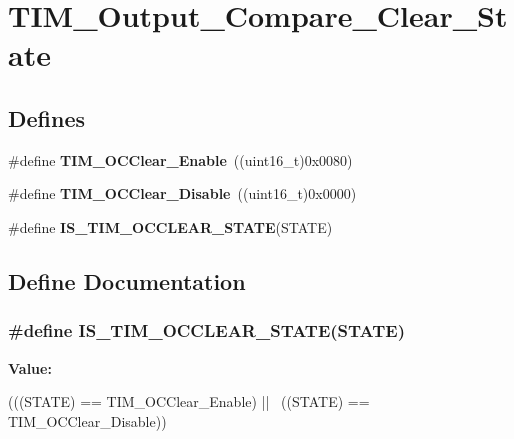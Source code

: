 \hypertarget{group__TIM__Output__Compare__Clear__State}{
\section{TIM\_\-Output\_\-Compare\_\-Clear\_\-State}
\label{group__TIM__Output__Compare__Clear__State}
}
\subsection*{Defines}
\begin{DoxyCompactItemize}
\item 
\hypertarget{group__TIM__Output__Compare__Clear__State_ga1b7bce48b3e1478aad98c95fbbe7a6e0}{
\#define {\bfseries TIM\_\-OCClear\_\-Enable}~((uint16\_\-t)0x0080)}
\label{group__TIM__Output__Compare__Clear__State_ga1b7bce48b3e1478aad98c95fbbe7a6e0}

\item 
\hypertarget{group__TIM__Output__Compare__Clear__State_gadb09946cb5dded7520baf4b19173204d}{
\#define {\bfseries TIM\_\-OCClear\_\-Disable}~((uint16\_\-t)0x0000)}
\label{group__TIM__Output__Compare__Clear__State_gadb09946cb5dded7520baf4b19173204d}

\item 
\#define {\bfseries IS\_\-TIM\_\-OCCLEAR\_\-STATE}(STATE)
\end{DoxyCompactItemize}


\subsection{Define Documentation}
\hypertarget{group__TIM__Output__Compare__Clear__State_ga5297586b42da9263ac4f767c83202fed}{
\subsubsection[{IS\_\-TIM\_\-OCCLEAR\_\-STATE}]{\setlength{\rightskip}{0pt plus 5cm}\#define IS\_\-TIM\_\-OCCLEAR\_\-STATE(STATE)}}
\label{group__TIM__Output__Compare__Clear__State_ga5297586b42da9263ac4f767c83202fed}
{\bfseries Value:}
\begin{DoxyCode}
(((STATE) == TIM_OCClear_Enable) || \
                                     ((STATE) == TIM_OCClear_Disable))
\end{DoxyCode}
